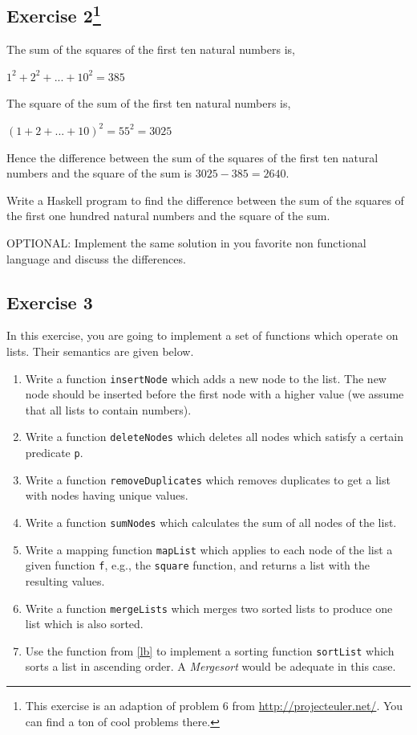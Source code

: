 \documentclass [11pt, a4wide, twoside]{article}
\begin{document}
\subsection*{Exercise 2\footnote{This exercise is an adaption of problem 6 from \url{http://projecteuler.net/}. You can find a ton of cool problems there.}}

The sum of the squares of the first ten natural numbers is,

$1^2 + 2^2 + ... + 10^2 = 385$

The square of the sum of the first ten natural numbers is,

$(1 + 2 + ... + 10)^2 = 55^2 = 3025$

Hence the difference between the sum of the squares of the first ten natural numbers and the square of the sum is $3025 - 385 = 2640.$

Write a Haskell program to find the difference between the sum of the squares of the first one hundred natural numbers and the square of the sum.

OPTIONAL: Implement the same solution in you favorite non functional language and discuss the differences.


\solution{}
\subsection*{Exercise 3}

In this exercise, you are going to implement a set of functions which operate on lists. Their semantics are given below.

\begin{enumerate}
\renewcommand{\theenumi}{\alph{enumi}}
\item Write a function \verb+insertNode+ which adds a new node to the list. The new node should be inserted before the first node with a higher value (we assume that all lists to contain numbers).
\item Write a function \verb+deleteNodes+ which deletes all nodes which satisfy a certain predicate \verb+p+.
\item Write a function \verb+removeDuplicates+ which removes duplicates to get a list with nodes having unique values.
\item Write a function \verb+sumNodes+ which calculates the sum of all nodes of the list.
\item Write a mapping function \verb+mapList+ which applies to each node of the list a given function \texttt{f}, e.g., the \verb+square+ function, and returns a list with the resulting values.
\item Write a function \verb+mergeLists+ which merges two sorted lists to produce one list which is also sorted.\label{lb}
\item Use the function from \ref{lb} to implement a sorting function \verb+sortList+ which sorts a list in ascending order. A \emph{Mergesort} would be adequate in this case.
\end{enumerate}
\end{document}
